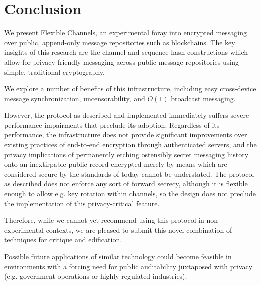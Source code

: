 \chapter{Conclusion}\label{Conclusion}

We present Flexible Channels, an experimental foray into encrypted messaging over public, append-only message repositories such as blockchains. The key insights of this research are the channel and sequence hash constructions which allow for privacy-friendly messaging across public message repositories using simple, traditional cryptography.

We explore a number of benefits of this infrastructure, including easy cross-device message synchronization, uncensorability, and $O(1)$ broadcast messaging.

However, the protocol as described and implemented immediately suffers severe performance impairments that preclude its adoption. Regardless of its performance, the infrastructure does not provide significant improvements over existing practices of end-to-end encryption through authenticated servers, and the privacy implications of permanently etching ostensibly secret messaging history onto an inextirpable public record encrypted merely by means which are considered secure by the standards of today cannot be understated. The protocol as described does not enforce any sort of forward secrecy, although it is flexible enough to allow e.g. key rotation within channels, so the design does not preclude the implementation of this privacy-critical feature.

Therefore, while we cannot yet recommend using this protocol in non-experimental contexts, we are pleased to submit this novel combination of techniques for critique and edification.

Possible future applications of similar technology could become feasible in environments with a forcing need for public auditability juxtaposed with privacy (e.g. government operations or highly-regulated industries).
